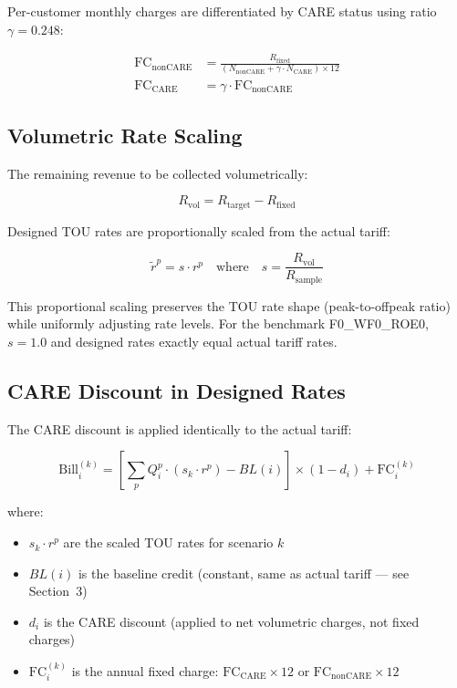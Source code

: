 \documentclass[11pt]{article}
\begin{document}
Per-customer monthly charges are differentiated by CARE status using ratio $\gamma = 0.248$:

\begin{align}
    \text{FC}_{\text{nonCARE}} &= \frac{R_{\text{fixed}}}{(N_{\text{nonCARE}} + \gamma \cdot N_{\text{CARE}}) \times 12} \\
    \text{FC}_{\text{CARE}} &= \gamma \cdot \text{FC}_{\text{nonCARE}}
\end{align}

\subsection{Volumetric Rate Scaling}

The remaining revenue to be collected volumetrically:

\begin{equation}
    R_{\text{vol}} = R_{\text{target}} - R_{\text{fixed}}
\end{equation}

Designed TOU rates are proportionally scaled from the actual tariff:

\begin{equation}
    \tilde{r}^p = s \cdot r^p \quad \text{where} \quad s = \frac{R_{\text{vol}}}{R_{\text{sample}}}
\end{equation}

This proportional scaling preserves the TOU rate shape (peak-to-offpeak ratio) while uniformly adjusting rate levels. For the benchmark F0\_WF0\_ROE0, $s = 1.0$ and designed rates exactly equal actual tariff rates.

\subsection{CARE Discount in Designed Rates}

The CARE discount is applied identically to the actual tariff:

\begin{equation}
    \text{Bill}_i^{(k)} = \left[ \sum_p Q_i^p \cdot (s_k \cdot r^p) - BL(i) \right] \times (1 - d_i) + \text{FC}_i^{(k)}
\end{equation}

where:
\begin{itemize}
    \item $s_k \cdot r^p$ are the scaled TOU rates for scenario $k$
    \item $BL(i)$ is the baseline credit (constant, same as actual tariff --- see Section~3)
    \item $d_i$ is the CARE discount (applied to net volumetric charges, not fixed charges)
    \item $\text{FC}_i^{(k)}$ is the annual fixed charge: $\text{FC}_{\text{CARE}} \times 12$ or $\text{FC}_{\text{nonCARE}} \times 12$
\end{itemize}
\end{document}
